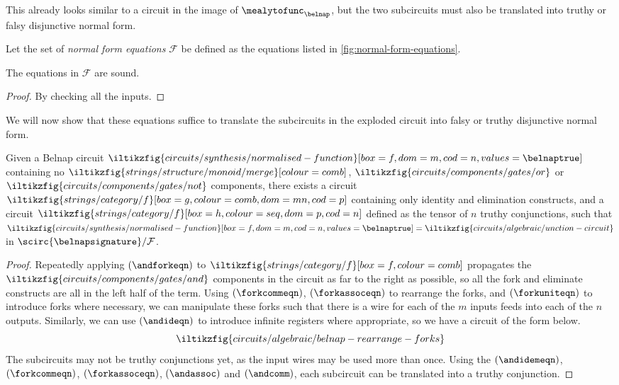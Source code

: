This already looks similar to a circuit in the image of
\(\mealytofunc_\belnap\), but the two subcircuits must also be translated into
truthy or falsy disjunctive normal form.

\begin{definition}
    Let the set of \emph{normal form equations} \(\mathcal{F}\) be defined as
    the equations listed in \cref{fig:normal-form-equations}.
\end{definition}

\begin{lemma}
    The equations in \(\mathcal{F}\) are sound.
\end{lemma}
\begin{proof}
    By checking all the inputs.
\end{proof}



We will now show that these equations suffice to translate the subcircuits in
the exploded circuit into falsy or truthy disjunctive normal form.

\begin{lemma}\label{lem:truthy-conjunction-normalising}
    Given a Belnap circuit \(
    \iltikzfig{circuits/synthesis/normalised-function}[box=f,dom=m,cod=n,values=\belnaptrue]
    \) containing no \(
    \iltikzfig{strings/structure/monoid/merge}[colour=comb]
    \), \(
    \iltikzfig{circuits/components/gates/or}
    \) or \(
    \iltikzfig{circuits/components/gates/not}
    \) components, there exists a circuit \(
    \iltikzfig{strings/category/f}[box=g,colour=comb,dom=mn,cod=p]
    \) containing only identity and elimination constructs, and a circuit \(
    \iltikzfig{strings/category/f}[box=h,colour=seq,dom=p,cod=n]
    \) defined as the tensor of \(n\) truthy conjunctions, such that \(
    \iltikzfig{circuits/synthesis/normalised-function}[box=f,dom=m,cod=n,values=\belnaptrue]
    =
    \iltikzfig{circuits/algebraic/unction-circuit}
    \) in \(\scirc{\belnapsignature} / \mathcal{F}\).
\end{lemma}
\begin{proof}
    Repeatedly applying \((\andforkeqn)\) to \(
    \iltikzfig{strings/category/f}[box=f,colour=comb]
    \) propagates the \(
    \iltikzfig{circuits/components/gates/and}
    \) components in the circuit as far to the right as possible, so all the
    fork and eliminate constructs are all in the left half of the term.
    Using \((\forkcommeqn)\), \((\forkassoceqn)\) to rearrange the forks, and
    \((\forkuniteqn)\) to introduce forks where necessary,
    we can manipulate these forks such that there is a wire for each of the \(m\)
    inputs feeds into each of the \(n\) outputs.
    Similarly, we can use \((\andideqn)\) to introduce infinite registers where
    appropriate, so we have a circuit of the form below. \[
        \iltikzfig{circuits/algebraic/belnap-rearrange-forks}
    \]
    The subcircuits may not be truthy conjunctions yet, as the input wires may
    be used more than once.
    Using the \((\andidemeqn)\), \((\forkcommeqn)\), \((\forkassoceqn)\),
    \((\andassoc)\) and \((\andcomm)\), each subcircuit can be translated into
    a truthy conjunction.
\end{proof}


